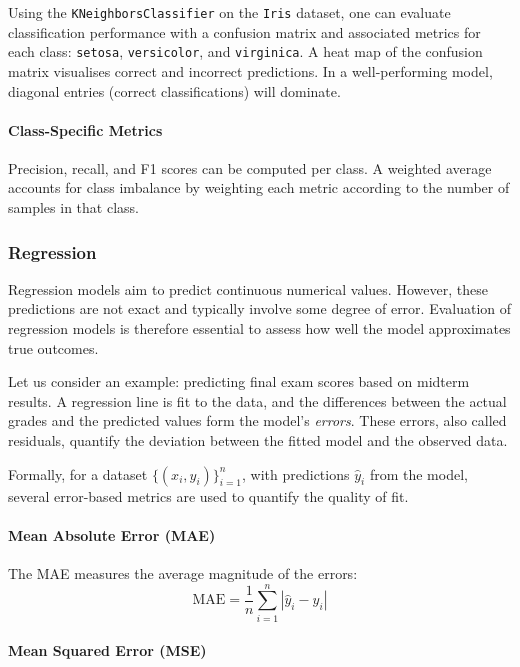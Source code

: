 \documentclass[9pt]{extarticle}
\begin{document}
Using the \texttt{KNeighborsClassifier} on the \texttt{Iris} dataset, one can evaluate classification performance with a confusion matrix and associated metrics for each class: \texttt{setosa}, \texttt{versicolor}, and \texttt{virginica}. A heat map of the confusion matrix visualises correct and incorrect predictions. In a well-performing model, diagonal entries (correct classifications) will dominate.

\paragraph{Class-Specific Metrics}

Precision, recall, and F1 scores can be computed per class. A weighted average accounts for class imbalance by weighting each metric according to the number of samples in that class.



\subsubsection{Regression}

Regression models aim to predict continuous numerical values. However, these predictions are not exact and typically involve some degree of error. Evaluation of regression models is therefore essential to assess how well the model approximates true outcomes.

Let us consider an example: predicting final exam scores based on midterm results. A regression line is fit to the data, and the differences between the actual grades and the predicted values form the model's \textit{errors}. These errors, also called residuals, quantify the deviation between the fitted model and the observed data.

Formally, for a dataset $\{(x_i, y_i)\}_{i=1}^n$, with predictions $\hat{y}_i$ from the model, several error-based metrics are used to quantify the quality of fit.

\paragraph{Mean Absolute Error (MAE)}

The MAE measures the average magnitude of the errors:
\[
\text{MAE} = \frac{1}{n} \sum_{i=1}^{n} |\hat{y}_i - y_i|
\]

\paragraph{Mean Squared Error (MSE)}
\end{document}
